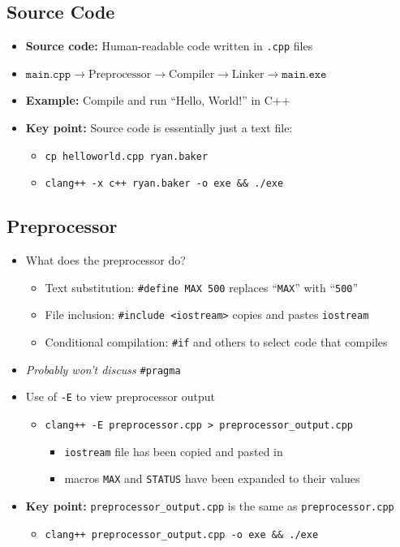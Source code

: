 \documentclass{article}
\begin{document}
\subsection{Source Code}

\begin{itemize}
	\item \textbf{Source code:} Human-readable code written in \texttt{.cpp} files
	\item $\texttt{main.cpp}\rightarrow\boxed{\textrm{Preprocessor}}\rightarrow\boxed{\textrm{Compiler}}\rightarrow\boxed{\textrm{Linker}}\rightarrow\texttt{main.exe}$
	\item \textbf{Example:} Compile and run ``Hello, World!'' in C++
	\item \textbf{Key point:} Source code is essentially just a text file: \begin{itemize}
		\item \texttt{cp helloworld.cpp ryan.baker}
		\item \texttt{clang++ -x c++ ryan.baker -o exe \&\& ./exe}
	\end{itemize}
\end{itemize}

\subsection{Preprocessor}

\begin{itemize}
	\item What does the preprocessor do? \begin{itemize}
		\item Text substitution: \texttt{\#define MAX 500} replaces ``\texttt{MAX}'' with ``\texttt{500}''
		\item File inclusion: \texttt{\#include <iostream>} copies and pastes \texttt{iostream}
		\item Conditional compilation: \texttt{\#if} and others to select code that compiles
		
	\end{itemize}
	\item \textit{Probably won't discuss} \texttt{\#pragma}
	\item Use of \texttt{-E} to view preprocessor output \begin{itemize}
		\item \texttt{clang++ -E preprocessor.cpp > preprocessor\_output.cpp} \begin{itemize}
			\item \texttt{iostream} file has been copied and pasted in
			\item macros \texttt{MAX} and \texttt{STATUS} have been expanded to their values
		\end{itemize}
	\end{itemize}
	\item \textbf{Key point:} \texttt{preprocessor\_output.cpp} is the same as \texttt{preprocessor.cpp} \begin{itemize}
		\item \texttt{clang++ preprocessor\_output.cpp -o exe \&\& ./exe}
	\end{itemize}
\end{itemize}
\end{document}
